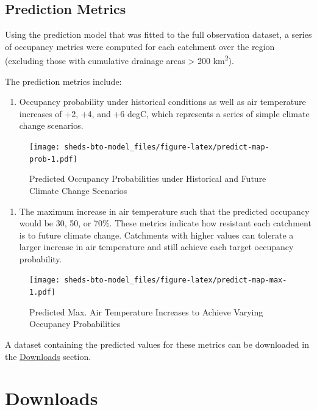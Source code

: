 \documentclass[
]{book}
\providecommand{\tightlist}{%
  \setlength{\itemsep}{0pt}\setlength{\parskip}{0pt}}
\begin{document}
\hypertarget{prediction-metrics}{%
\section{Prediction Metrics}\label{prediction-metrics}}

Using the prediction model that was fitted to the full observation dataset, a series of occupancy metrics were computed for each catchment over the region (excluding those with cumulative drainage areas \textgreater{} 200 km\textsuperscript{2}).

The prediction metrics include:

\begin{enumerate}
\def\labelenumi{\arabic{enumi}.}
\tightlist
\item
  Occupancy probability under historical conditions as well as air temperature increases of +2, +4, and +6 degC, which represents a series of simple climate change scenarios.
\end{enumerate}

\begin{figure}
\centering
\texttt{[image: sheds-bto-model\_files/figure-latex/predict-map-prob-1.pdf]}
\caption{\label{fig:predict-map-prob}Predicted Occupancy Probabilities under Historical and Future Climate Change Scenarios}
\end{figure}

\begin{enumerate}
\def\labelenumi{\arabic{enumi}.}
\setcounter{enumi}{1}
\tightlist
\item
  The maximum increase in air temperature such that the predicted occupancy would be 30, 50, or 70\%. These metrics indicate how resistant each catchment is to future climate change. Catchments with higher values can tolerate a larger increase in air temperature and still achieve each target occupancy probability.
\end{enumerate}

\begin{figure}
\centering
\texttt{[image: sheds-bto-model\_files/figure-latex/predict-map-max-1.pdf]}
\caption{\label{fig:predict-map-max}Predicted Max. Air Temperature Increases to Achieve Varying Occupancy Probabilities}
\end{figure}

A dataset containing the predicted values for these metrics can be downloaded in the \protect\hyperlink{downloads}{Downloads} section.

\hypertarget{downloads}{%
\chapter{Downloads}\label{downloads}}
\end{document}

